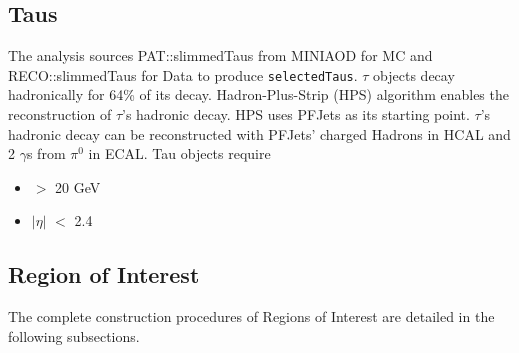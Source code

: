 \subsection{Taus}\label{sec:taus}

The analysis sources PAT::slimmedTaus from MINIAOD for MC and RECO::slimmedTaus for Data to produce {\tt selectedTaus}.
$\tau$ objects decay hadronically for 64\% of its decay. Hadron-Plus-Strip (HPS) algorithm enables the reconstruction of $\tau$'s hadronic decay. 
HPS uses PFJets as its starting point. 
$\tau$'s hadronic decay can be reconstructed with PFJets' charged Hadrons in HCAL and 2 $\gamma$s from $\pi^{0}$ in ECAL.  
Tau objects require
\begin{itemize}
  \item \pt $>$ 20 GeV
  \item $|\eta|$ $<$ 2.4
\end{itemize}

\subsection{Region of Interest}\label{sec:ROIs}

The complete construction procedures of Regions of Interest are detailed in the following subsections.


